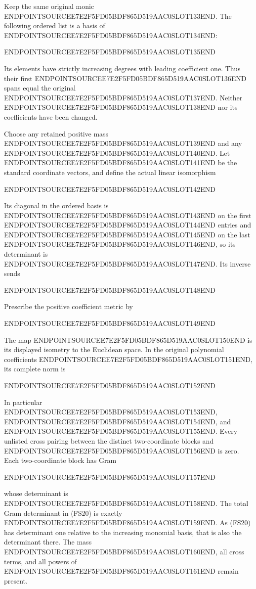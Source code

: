 Keep the same original monic ENDPOINTSOURCEE7E2F5FD05BDF865D519AAC0SLOT133END. The following ordered list is a basis of ENDPOINTSOURCEE7E2F5FD05BDF865D519AAC0SLOT134END:

ENDPOINTSOURCEE7E2F5FD05BDF865D519AAC0SLOT135END

Its elements have strictly increasing degrees with leading coefficient one. Thus their first ENDPOINTSOURCEE7E2F5FD05BDF865D519AAC0SLOT136END spans equal the original ENDPOINTSOURCEE7E2F5FD05BDF865D519AAC0SLOT137END. Neither ENDPOINTSOURCEE7E2F5FD05BDF865D519AAC0SLOT138END nor its coefficients have been changed.

Choose any retained positive mass ENDPOINTSOURCEE7E2F5FD05BDF865D519AAC0SLOT139END and any ENDPOINTSOURCEE7E2F5FD05BDF865D519AAC0SLOT140END. Let ENDPOINTSOURCEE7E2F5FD05BDF865D519AAC0SLOT141END be the standard coordinate vectors, and define the actual linear isomorphism

ENDPOINTSOURCEE7E2F5FD05BDF865D519AAC0SLOT142END

Its diagonal in the ordered basis is ENDPOINTSOURCEE7E2F5FD05BDF865D519AAC0SLOT143END on the first ENDPOINTSOURCEE7E2F5FD05BDF865D519AAC0SLOT144END entries and ENDPOINTSOURCEE7E2F5FD05BDF865D519AAC0SLOT145END on the last ENDPOINTSOURCEE7E2F5FD05BDF865D519AAC0SLOT146END, so its determinant is ENDPOINTSOURCEE7E2F5FD05BDF865D519AAC0SLOT147END. Its inverse sends

ENDPOINTSOURCEE7E2F5FD05BDF865D519AAC0SLOT148END

Prescribe the positive coefficient metric by

ENDPOINTSOURCEE7E2F5FD05BDF865D519AAC0SLOT149END

The map ENDPOINTSOURCEE7E2F5FD05BDF865D519AAC0SLOT150END is its displayed isometry to the Euclidean space. In the original polynomial coefficients ENDPOINTSOURCEE7E2F5FD05BDF865D519AAC0SLOT151END, its complete norm is

ENDPOINTSOURCEE7E2F5FD05BDF865D519AAC0SLOT152END

In particular ENDPOINTSOURCEE7E2F5FD05BDF865D519AAC0SLOT153END, ENDPOINTSOURCEE7E2F5FD05BDF865D519AAC0SLOT154END, and ENDPOINTSOURCEE7E2F5FD05BDF865D519AAC0SLOT155END. Every unlisted cross pairing between the distinct two-coordinate blocks and ENDPOINTSOURCEE7E2F5FD05BDF865D519AAC0SLOT156END is zero. Each two-coordinate block has Gram

ENDPOINTSOURCEE7E2F5FD05BDF865D519AAC0SLOT157END

whose determinant is ENDPOINTSOURCEE7E2F5FD05BDF865D519AAC0SLOT158END. The total Gram determinant in (FS20) is exactly ENDPOINTSOURCEE7E2F5FD05BDF865D519AAC0SLOT159END. As (FS20) has determinant one relative to the increasing monomial basis, that is also the determinant there. The mass ENDPOINTSOURCEE7E2F5FD05BDF865D519AAC0SLOT160END, all cross terms, and all powers of ENDPOINTSOURCEE7E2F5FD05BDF865D519AAC0SLOT161END remain present.

